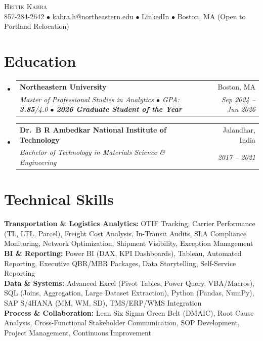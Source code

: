 \documentclass[letterpaper,10pt]{article}
\makeatletter
\newcommand{\resumeSubheading}[4]{
  \vspace{1pt}\item
    \begin{tabular*}{0.97\textwidth}[t]{l@{\extracolsep{\fill}}r}
      \textbf{#1} & #2 \\
      \textit{\small#3} & \textit{\small #4} \\
    \end{tabular*}\vspace{-4pt}
}
\newcommand{\resumeSubHeadingListStart}{\begin{itemize}[leftmargin=0.15in, label={}]}
\newcommand{\resumeSubHeadingListEnd}{\end{itemize}}
\makeatother
\begin{document}
\begin{center}
    {\Huge \scshape \color{heading} Hritik Kabra} \\ \vspace{2pt}
    \small 857-284-2642 $\bullet$
    \href{mailto:kabra.h@northeastern.edu}{\underline{kabra.h@northeastern.edu}} $\bullet$
    \href{https://www.linkedin.com/in/hritikkabra888}{\underline{LinkedIn}} $\bullet$
    Boston, MA (Open to Portland Relocation)
\end{center}

\section{Education}
\resumeSubHeadingListStart
\resumeSubheading
{Northeastern University}{Boston, MA}
{Master of Professional Studies in Analytics $\bullet$ GPA: \textbf{3.85}/4.0 $\bullet$ \textbf{2026 Graduate Student of the Year}}{Sep 2024 -- Jun 2026}
\resumeSubheading
{Dr.\ B R Ambedkar National Institute of Technology}{Jalandhar, India}
{Bachelor of Technology in Materials Science \& Engineering}{2017 -- 2021}
\resumeSubHeadingListEnd

\section{Technical Skills}
\begin{itemize}[leftmargin=0.15in, label={}]
\small{\item{
\textbf{Transportation \& Logistics Analytics:} OTIF Tracking, Carrier Performance (TL, LTL, Parcel), Freight Cost Analysis, In-Transit Audits, SLA Compliance Monitoring, Network Optimization, Shipment Visibility, Exception Management \\
\textbf{BI \& Reporting:} Power BI (DAX, KPI Dashboards), Tableau, Automated Reporting, Executive QBR/MBR Packages, Data Storytelling, Self-Service Reporting \\
\textbf{Data \& Systems:} Advanced Excel (Pivot Tables, Power Query, VBA/Macros), SQL (Joins, Aggregation, Large Dataset Extraction), Python (Pandas, NumPy), SAP S/4HANA (MM, WM, SD), TMS/ERP/WMS Integration \\
\textbf{Process \& Collaboration:} Lean Six Sigma Green Belt (DMAIC), Root Cause Analysis, Cross-Functional Stakeholder Communication, SOP Development, Project Management, Continuous Improvement
}}
\end{itemize}
\end{document}
